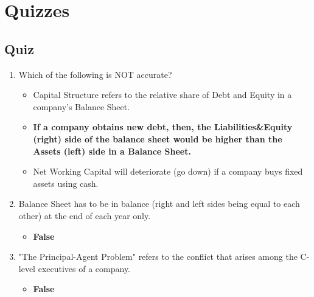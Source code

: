 \section{Quizzes}
\begin{tiny}
  \subsection{Quiz}
  \begin{enumerate}[itemsep=-0.5em]
    \item Which of the following is NOT accurate?
          \begin{itemize}[itemsep=-0.2em]
            \item Capital Structure refers to the relative share of Debt and Equity in a company's Balance Sheet.
            \item \textbf{If a company obtains new debt, then, the Liabilities\&Equity (right) side of the balance sheet would be higher than the Assets (left) side in a Balance Sheet.}
            \item Net Working Capital will deteriorate (go down) if a company buys fixed assets using cash.
          \end{itemize}
    \item Balance Sheet has to be in balance (right and left sides being equal to each other) at the end of each year only.
          \begin{itemize}[itemsep=-0.2em]
            \item \textbf{False}
          \end{itemize}
    \item "The Principal-Agent Problem" refers to the conflict that arises among the C-level executives of a company.
          \begin{itemize}[itemsep=-0.2em]
            \item \textbf{False}
          \end{itemize}
  \end{enumerate}

\end{tiny}
